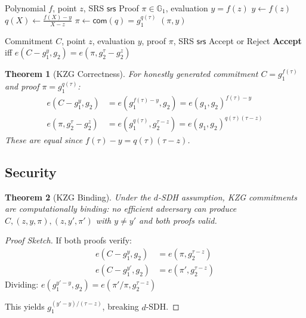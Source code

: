 \documentclass[11pt,a4paper]{article}
\newtheorem{theorem}{Theorem}[section]
\newcommand{\G}{\mathbb{G}}
\newcommand{\com}{\mathsf{com}}
\begin{document}
\begin{algorithm}
\caption{KZG Opening}
\label{alg:kzg-open}
\begin{algorithmic}[1]
\Require Polynomial $f$, point $z$, SRS $\mathsf{srs}$
\Ensure Proof $\pi \in \G_1$, evaluation $y = f(z)$
\State $y \gets f(z)$
\State $q(X) \gets \frac{f(X) - y}{X - z}$ 
\State $\pi \gets \com(q) = g_1^{q(\tau)}$
\State \Return $(\pi, y)$
\end{algorithmic}
\end{algorithm}

\begin{algorithm}
\caption{KZG Verification}
\label{alg:kzg-verify}
\begin{algorithmic}[1]
\Require Commitment $C$, point $z$, evaluation $y$, proof $\pi$, SRS $\mathsf{srs}$
\Ensure Accept or Reject
\State \textbf{Accept} iff $e(C - g_1^y, g_2) = e(\pi, g_2^\tau - g_2^z)$
\end{algorithmic}
\end{algorithm}

\begin{theorem}[KZG Correctness]
For honestly generated commitment $C = g_1^{f(\tau)}$ and proof $\pi = g_1^{q(\tau)}$:
\begin{align*}
e(C - g_1^y, g_2) &= e(g_1^{f(\tau) - y}, g_2) = e(g_1, g_2)^{f(\tau) - y} \\
e(\pi, g_2^\tau - g_2^z) &= e(g_1^{q(\tau)}, g_2^{\tau - z}) = e(g_1, g_2)^{q(\tau)(\tau - z)}
\end{align*}
These are equal since $f(\tau) - y = q(\tau)(\tau - z)$.
\end{theorem}

\subsection{Security}

\begin{theorem}[KZG Binding]
Under the $d$-SDH assumption, KZG commitments are computationally binding: no efficient adversary can produce $C, (z, y, \pi), (z, y', \pi')$ with $y \neq y'$ and both proofs valid.
\end{theorem}

\begin{proof}[Proof Sketch]
If both proofs verify:
\begin{align*}
e(C - g_1^y, g_2) &= e(\pi, g_2^{\tau - z}) \\
e(C - g_1^{y'}, g_2) &= e(\pi', g_2^{\tau - z})
\end{align*}
Dividing: $e(g_1^{y' - y}, g_2) = e(\pi'/\pi, g_2^{\tau - z})$

This yields $g_1^{(y' - y)/(\tau - z)}$, breaking $d$-SDH.
\end{proof}
\end{document}
